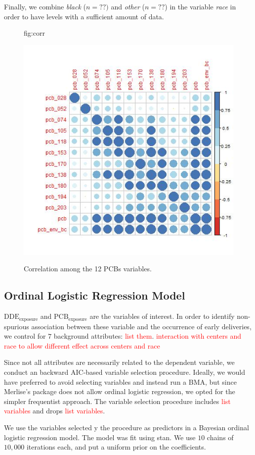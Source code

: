 \documentclass[wcp]{jmlr}%
\newcommand\todo[1]{\textcolor{red}{#1}}
\begin{document}
Finally, we combine \textit{black} ($n=??)$ and \textit{other} ($n=??$) in the variable \textit{race} in order to have levels with a sufficient amount of data.

\begin{figure}[htbp]
	\floatconts
	{fig:corr}
	{\caption{Correlation among the 12 PCBs variables.}}
	{\includegraphics[width=0.8\linewidth]{pcb_corr}}
\end{figure}

\subsection{Ordinal Logistic Regression Model}
$\text{DDE}_{\text{exposure}}$ and $\text{PCB}_{\text{exposure}}$ are the variables of interest. In order to identify non-spurious association between these variable and the occurrence of early deliveries, we control for $7$ background attributes: \todo{list them}.
\todo{interaction with centers and race to allow different effect across centers and race}

Since not all attributes are necessarily related to the dependent variable, we conduct an backward AIC-based variable selection procedure. Ideally, we would have preferred to avoid selecting variables and instead run a BMA, but since Merlise's package does not allow ordinal logistic regression, we opted for the simpler frequentist approach. The variable selection procedure includes \todo{list variables} and drops \todo{list variables}.

We use the variables selected y the procedure as predictors in a Bayesian ordinal logistic regression model. The model was fit using stan. We use $10$ chains of $10,000$ iterations each, and put a uniform prior on the coefficients.
\end{document}
